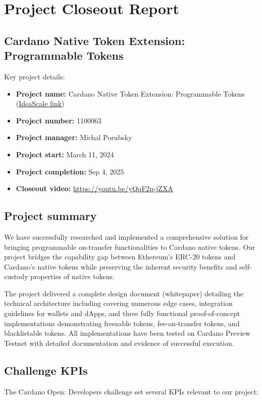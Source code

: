 \section{Project Closeout Report}

\subsection{Cardano Native Token Extension:\\ Programmable Tokens}

Key project details:
\begin{itemize}
\item \textbf{Project name:} Cardano Native Token Extension: Programmable Tokens (\href{https://cardano.ideascale.com/c/cardano/idea/114288}{IdeaScale link})
\item \textbf{Project number:} 1100063
\item \textbf{Project manager:} Michal Porubsky
\item \textbf{Project start:} March 11, 2024
\item \textbf{Project completion:} Sep 4, 2025
\item \textbf{Closeout video:} \url{https://youtu.be/yQqF2p-jZXA}
\end{itemize}

\subsection{Project summary}
We have successfully researched and implemented a comprehensive solution for bringing programmable on-transfer functionalities to Cardano native tokens. Our project bridges the capability gap between Ethereum's ERC-20 tokens and Cardano's native tokens while preserving the inherent security benefits and self-custody properties of native tokens.

The project delivered a complete design document (whitepaper) detailing the technical architecture including covering numerous edge cases, integration guidelines for wallets and dApps, and three fully functional proof-of-concept implementations demonstrating freezable tokens, fee-on-transfer tokens, and blacklistable tokens. All implementations have been tested on Cardano Preview Testnet with detailed documentation and evidence of successful execution.

\subsection{Challenge KPIs}
The Cardano Open: Developers challenge set several KPIs relevant to our project:


